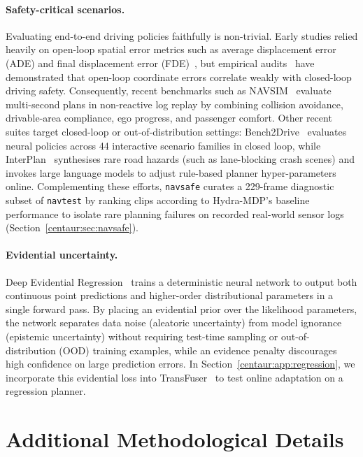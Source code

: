 \paragraph{Safety-critical scenarios.} Evaluating end-to-end driving policies faithfully is non-trivial. Early studies relied heavily on open-loop spatial error metrics such as average displacement error (ADE) and final displacement error (FDE)~\cite{hu2023uniad,jiang2023vad,hu2023gaia}, but empirical audits~\cite{li2024ego} have demonstrated that open-loop coordinate errors correlate weakly with closed-loop driving safety. Consequently, recent benchmarks such as NAVSIM~\cite{dauner2024navsim} evaluate multi-second plans in non-reactive log replay by combining collision avoidance, drivable-area compliance, ego progress, and passenger comfort. Other recent suites target closed-loop or out-of-distribution settings: Bench2Drive~\cite{jia2024bench2drive} evaluates neural policies across 44 interactive scenario families in closed loop, while InterPlan~\cite{hallgarten2024interplan} synthesises rare road hazards (such as lane-blocking crash scenes) and invokes large language models to adjust rule-based planner hyper-parameters online. Complementing these efforts, \texttt{navsafe} curates a 229-frame diagnostic subset of \texttt{navtest} by ranking clips according to Hydra-MDP's baseline performance to isolate rare planning failures on recorded real-world sensor logs (Section~\ref{centaur:sec:navsafe}).

\paragraph{Evidential uncertainty.} Deep Evidential Regression~\cite{amini2020deepevidential} trains a deterministic neural network to output both continuous point predictions and higher-order distributional parameters in a single forward pass. By placing an evidential prior over the likelihood parameters, the network separates data noise (aleatoric uncertainty) from model ignorance (epistemic uncertainty) without requiring test-time sampling or out-of-distribution (OOD) training examples, while an evidence penalty discourages high confidence on large prediction errors. In Section~\ref{centaur:app:regression}, we incorporate this evidential loss into TransFuser~\cite{chitta2023transfuser} to test online adaptation on a regression planner.

\section{Additional Methodological Details}\label{centaur:app:method}

